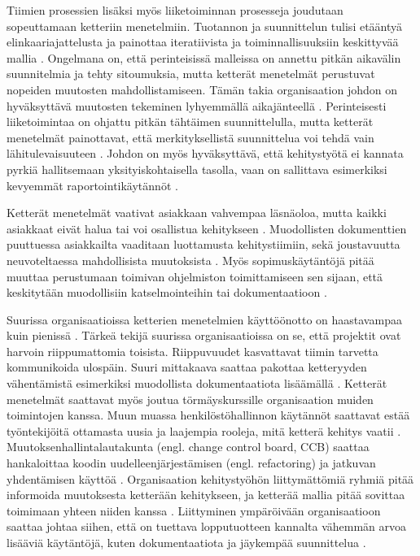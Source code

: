 Tiimien prosessien lisäksi myös liiketoiminnan prosesseja joudutaan sopeuttamaan
ketteriin menetelmiin. Tuotannon ja suunnittelun tulisi etääntyä
elinkaariajattelusta ja painottaa iteratiivista ja toiminnallisuuksiin
keskittyvää mallia . Ongelmana on, että perinteisissä
malleissa on annettu pitkän aikavälin suunnitelmia ja tehty sitoumuksia, mutta
ketterät menetelmät perustuvat nopeiden muutosten mahdollistamiseen. Tämän takia
organisaation johdon on hyväksyttävä muutosten tekeminen lyhyemmällä
aikajänteellä . Perinteisesti liiketoimintaa on ohjattu
pitkän tähtäimen suunnittelulla, mutta ketterät menetelmät painottavat, että
merkityksellistä suunnittelua voi tehdä vain lähitulevaisuuteen
. Johdon on myös hyväksyttävä, että kehitystyötä ei kannata
pyrkiä hallitsemaan yksityiskohtaisella tasolla, vaan on sallittava esimerkiksi
kevyemmät raportointikäytännöt .

Ketterät menetelmät vaativat asiakkaan vahvempaa läsnäoloa, mutta kaikki
asiakkaat eivät halua tai voi osallistua kehitykseen .
Muodollisten dokumenttien puuttuessa asiakkailta vaaditaan luottamusta
kehitystiimiin, sekä joustavuutta neuvoteltaessa mahdollisista muutoksista
. Myös sopimuskäytäntöjä pitää muuttaa perustumaan toimivan
ohjelmiston toimittamiseen sen sijaan, että keskitytään muodollisiin
katselmointeihin tai dokumentaatioon .

Suurissa organisaatioissa ketterien menetelmien käyttöönotto on haastavampaa
kuin pienissä . Tärkeä tekijä suurissa
organisaatioissa on se, että projektit ovat harvoin riippumattomia toisista.
Riippuvuudet kasvattavat tiimin tarvetta kommunikoida ulospäin. Suuri mittakaava
saattaa pakottaa ketteryyden vähentämistä esimerkiksi muodollista
dokumentaatiota lisäämällä . Ketterät menetelmät
saattavat myös joutua törmäyskurssille organisaation muiden toimintojen kanssa.
Muun muassa henkilöstöhallinnon käytännöt saattavat estää työntekijöitä
ottamasta uusia ja laajempia rooleja, mitä ketterä kehitys vaatii
. Muutoksenhallintalautakunta (engl. change control board,
CCB) saattaa hankaloittaa koodin uudelleenjärjestämisen (engl. refactoring) ja
jatkuvan yhdentämisen käyttöä . Organisaation
kehitystyöhön liittymättömiä ryhmiä pitää informoida muutoksesta ketterään
kehitykseen, ja ketterää mallia pitää sovittaa toimimaan yhteen niiden kanssa
. Liittyminen ympäröivään
organisaatioon saattaa johtaa siihen, että on tuettava lopputuotteen kannalta
vähemmän arvoa lisääviä käytäntöjä, kuten dokumentaatiota ja jäykempää
suunnittelua .

